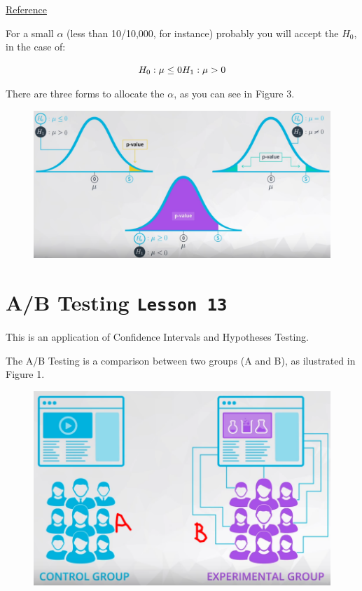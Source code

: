 \documentclass[]{book}
\begin{document}
\href{https://rebeccaebarnes.github.io/2018/05/01/what-is-a-p-value}{Reference}

For a small \(\alpha\) (less than 10/10,000, for instance) probably you
will accept the \(H_0\), in the case of:

\[H_0: \mu \leq 0 \\ H_1: \mu > 0\]

There are three forms to allocate the \(\alpha\), as you can see in
Figure 3.

\begin{figure}
\centering
\includegraphics{01-img/c4_l12_03.png}
\caption{}
\end{figure}

\section{\texorpdfstring{A/B Testing
\texttt{Lesson\ 13}}{A/B Testing Lesson 13}}\label{ab-testing-lesson-13}

This is an application of Confidence Intervals and Hypotheses Testing.

The A/B Testing is a comparison between two groups (A and B), as
ilustrated in Figure 1.

\begin{figure}
\centering
\includegraphics{01-img/c4_l13_01.png}
\caption{}
\end{figure}
\end{document}
